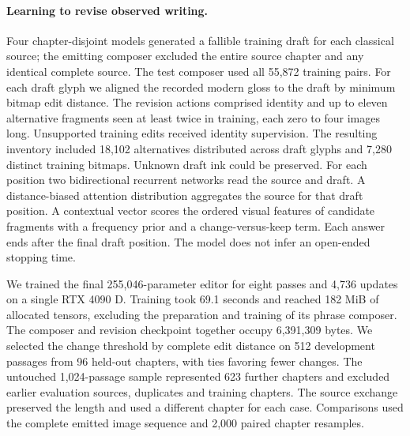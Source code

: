 \documentclass[12pt,a4paper]{article}
\providecommand{\DIFadd}[1]{{\protect\color{blue} \sf #1}} %
\begin{document}
\paragraph{\DIFadd{Learning to revise observed writing.}}
\DIFadd{Four chapter-disjoint models generated a fallible training draft for each classical source; the emitting composer excluded the entire source chapter and any identical complete source. The test composer used all 55,872 training pairs. For each draft glyph we aligned the recorded modern gloss to the draft by minimum bitmap edit distance. The revision actions comprised identity and up to eleven alternative fragments seen at least twice in training, each zero to four images long. Unsupported training edits received identity supervision. The resulting inventory included 18,102 alternatives distributed across draft glyphs and 7,280 distinct training bitmaps. Unknown draft ink could be preserved. For each position two bidirectional recurrent networks read the source and draft. A distance-biased attention distribution aggregates the source for that draft position. A contextual vector scores the ordered visual features of candidate fragments with a frequency prior and a change-versus-keep term. Each answer ends after the final draft position. The model does not infer an open-ended stopping time.
}

\DIFadd{We trained the final 255,046-parameter editor for eight passes and 4,736 updates on a single RTX 4090 D. Training took 69.1 seconds and reached 182 MiB of allocated tensors, excluding the preparation and training of its phrase composer. The composer and revision checkpoint together occupy 6,391,309 bytes. We selected the change threshold by complete edit distance on 512 development passages from 96 held-out chapters, with ties favoring fewer changes. The untouched 1,024-passage sample represented 623 further chapters and excluded earlier evaluation sources, duplicates and training chapters. The source exchange preserved the length and used a different chapter for each case. Comparisons used the complete emitted image sequence and 2,000 paired chapter resamples.
}
\end{document}
